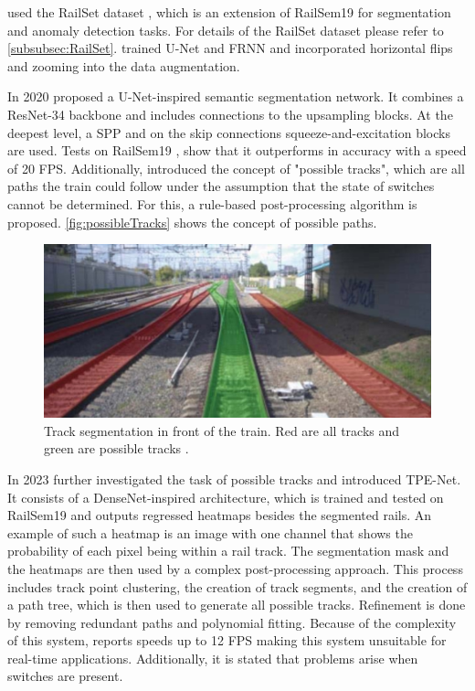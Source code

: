 \cite{hadded2022application} used the RailSet dataset \cite{railSet2022}, which is an extension of RailSem19 for segmentation and anomaly detection tasks.
For details of the RailSet dataset please refer to \autoref{subsubsec:RailSet}.
\cite{hadded2022application} trained U-Net \cite{uNet2015} and FRNN \cite{FRRNBModel2017} and incorporated horizontal flips and zooming into the data augmentation.

In 2020 \cite{RailraodSemanticPossibleTracks2020} proposed a U-Net-inspired \cite{uNet2015} semantic segmentation network.
It combines a ResNet-34 backbone \cite{ResNet} and includes connections to the upsampling blocks.
At the deepest level, a \ac{SPP} \cite{spatialPyramidPooling2014} and on the skip connections squeeze-and-excitation blocks \cite{SqueezeAndExcitation2019} are used.
Tests on RailSem19 \cite{railsem19dataset}, show that it outperforms \cite{railNet2019} in accuracy with a speed of 20 \ac{FPS}.
Additionally, \cite{RailraodSemanticPossibleTracks2020} introduced the concept of "possible tracks", which are all paths the train could follow under the assumption that the state of switches cannot be determined.
For this, a rule-based post-processing algorithm is proposed. \autoref{fig:possibleTracks} shows the concept of possible paths.

\vspace{1cm}

\begin{figure}
    \centering
    \includegraphics[width=0.5\linewidth]{PICs//semanticSegmentation/possibleTracks.jpg}
    \caption{Track segmentation in front of the train. Red are all tracks and green are possible tracks \cite{RailraodSemanticPossibleTracks2020}.}
    \label{fig:possibleTracks}
\end{figure}

\vspace{1cm}

In 2023 \cite{TPENet2023} further investigated the task of possible tracks and introduced \ac{TPE-Net}.
It consists of a DenseNet-inspired architecture, which is trained and tested on RailSem19 and outputs regressed heatmaps besides the segmented rails.
An example of such a heatmap is an image with one channel that shows the probability of each pixel being within a rail track.
The segmentation mask and the heatmaps are then used by a complex post-processing approach.
This process includes track point clustering, the creation of track segments, and the creation of a path tree, which is then used to generate all possible tracks.
Refinement is done by removing redundant paths and polynomial fitting.
Because of the complexity of this system, \cite{TPENet2023} reports speeds up to 12 \ac{FPS} making this system unsuitable for real-time applications.
Additionally, it is stated that problems arise when switches are present.

